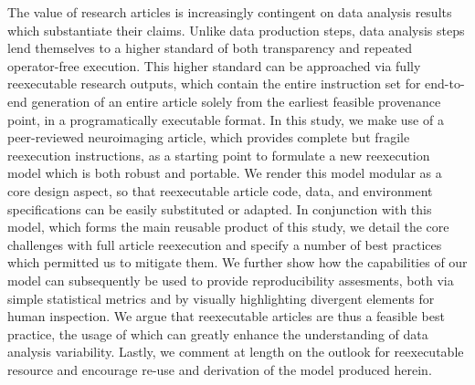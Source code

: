 The value of research articles is increasingly contingent on data analysis results which substantiate their claims.
Unlike data production steps, data analysis steps lend themselves to a higher standard of both transparency and repeated operator-free execution.
This higher standard can be approached via fully reexecutable research outputs, which contain the entire instruction set for end-to-end generation of an entire article solely from the earliest feasible provenance point, in a programatically executable format.
In this study, we make use of a peer-reviewed neuroimaging article, which provides complete but fragile reexecution instructions, as a starting point to formulate a new reexecution model which is both robust and portable.
We render this model modular as a core design aspect, so that reexecutable article code, data, and environment specifications can be easily substituted or adapted.
In conjunction with this model, which forms the main reusable product of this study, we detail the core challenges with full article reexecution and specify a number of best practices which permitted us to mitigate them.
We further show how the capabilities of our model can subsequently be used to provide reproducibility assesments, both via simple statistical metrics and by visually highlighting divergent elements for human inspection.
We argue that reexecutable articles are thus a feasible best practice, the usage of which can greatly enhance the understanding of data analysis variability.
Lastly, we comment at length on the outlook for reexecutable resource and encourage re-use and derivation of the model produced herein.

